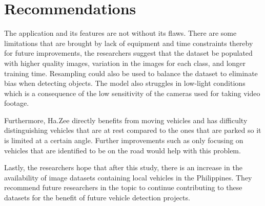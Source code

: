 \section{Recommendations}

The application and its features are not without its flaws. There are some limitations that are brought by lack of equipment and time constraints thereby for future improvements, the researchers suggest that the dataset be populated with higher quality images, variation in the images for each class, and longer training time. Resampling could also be used to balance the dataset to eliminate bias when detecting objects. The model also struggles in low-light conditions which is a consequence of the low sensitivity of the cameras used for taking video footage. 

Furthermore, Ha.Zee directly benefits from moving vehicles and has difficulty distinguishing vehicles that are at rest compared to the ones that are parked so it is limited at a certain angle. Further improvements such as only focusing on vehicles that are identified to be on the road would help with this problem. 

Lastly, the researchers hope that after this study, there is an increase in the availability of image datasets containing local vehicles in the Philippines. They recommend future researchers in the topic to continue contributing to these datasets for the benefit of future vehicle detection projects.


